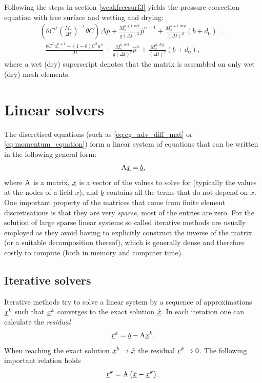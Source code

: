 Following the steps in section \ref{weakfreesurf3} yields the pressure correction equation with free surface and wetting and drying:
\begin{equation}
\begin{split}
\left(\theta C^T(\frac{M_u}{\Delta t})^{-1} \theta C\right) \Delta \hat p + \frac{M^{n+1, wet}_s}{g(\Delta t)^2} \hat p^{n+1}+ \frac{M^{n+1, dry}_s}{(\Delta t)^2}(b+d_0) = \\
-\frac{\theta C^T u_*^{n+1} + (1-\theta)C^Tu^n}{\Delta t}+\frac{M^{n, wet}_s}{g(\Delta t)^2} \hat p^{n}+ \frac{M^{n, dry}_s}{(\Delta t)^2}(b+d_0),
\end{split}
\end{equation}
where a wet (dry) superscript denotes that the matrix is assembled on only wet (dry) mesh elements.


\section{Linear solvers} \label{ND_Linear_solvers}
The discretised equations (such as \eqref{eq:cg_adv_diff_mat} or \eqref{eq:momentum_equation}) form
a linear system of equations that can be written
in the following general form:
\begin{equation*}
  \mathrm{A}\underline{x}=\underline{b},
\end{equation*}
where $\mathrm{A}$ is a matrix, $\underline{x}$ is a vector of the values
to solve for (typically the values at the nodes of a field $x$),
and $\underline{b}$ contains all the terms that do not depend on
$x$. One important property of the matrices that come from
finite element discretisations is that they are very \emph{sparse},
\ie most of the entries are zero. For the solution of large
sparse linear systems so called iterative methods are usually employed
as they
avoid having to explicitly construct the inverse of the matrix
(or a suitable decomposition thereof),
which is generally dense and therefore costly to compute
(both in memory and computer time).

\subsection{Iterative solvers}
Iterative methods try to solve a linear system by a sequence
of approximations $\underline{x}^k$ such that $\underline{x}^k$ converges to
the exact solution $\underline{\hat x}$. In each iteration one can
calculate the \emph{residual}
\begin{equation*}
  \underline{r}^k = \underline{b} - \mathrm{A}\underline{x}^k.
\end{equation*}
When reaching the exact solution $\underline{x}^k\to\underline{\hat x}$ the
residual $\underline{r}^k\to 0$. The following important relation holds
\begin{equation}\label{eq:residual_error}
  \underline{r}^k = \mathrm{A}\left( \underline{\hat x} - \underline{x}^k \right).
\end{equation}

